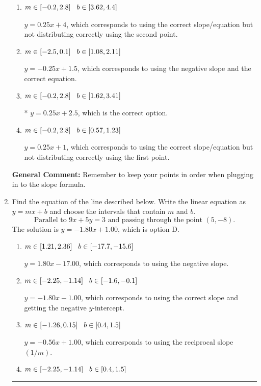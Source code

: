 \documentclass{extbook}[14pt]
\newcommand{\litem}[1]{\item #1

\rule{\textwidth}{0.4pt}}
\begin{document}
\begin{enumerate}
{\begin{enumerate}[label=\Alph*.]
 $y = 0.25x -2.5$, which corresponds to using the correct slope and getting the negative y-intercept.
\item \( m \in [-0.2, 2.8] \hspace*{3mm} b \in [3.62, 4.4] \)

 $y = 0.25x + 4$, which corresponds to using the correct slope/equation but not distributing correctly using the second point.
\item \( m \in [-2.5, 0.1] \hspace*{3mm} b \in [1.08, 2.11] \)

 $y = -0.25x + 1.5$, which corresponds to using the negative slope and the correct equation.
\item \( m \in [-0.2, 2.8] \hspace*{3mm} b \in [1.62, 3.41] \)

* $y = 0.25x + 2.5$, which is the correct option.
\item \( m \in [-0.2, 2.8] \hspace*{3mm} b \in [0.57, 1.23] \)

 $y = 0.25x + 1$, which corresponds to using the correct slope/equation but not distributing correctly using the first point.
\end{enumerate}

\textbf{General Comment:} Remember to keep your points in order when plugging in to the slope formula.
}
\litem{
Find the equation of the line described below. Write the linear equation as $ y=mx+b $ and choose the intervals that contain $m$ and $b$.
\[ \text{Parallel to } 9 x + 5 y = 3 \text{ and passing through the point } (5, -8). \]The solution is \( y = -1.80x + 1.00 \), which is option D.\begin{enumerate}[label=\Alph*.]
\item \( m \in [1.21, 2.36] \hspace*{3mm} b \in [-17.7, -15.6] \)

 $y = 1.80x - 17.00$, which corresponds to using the negative slope.
\item \( m \in [-2.25, -1.14] \hspace*{3mm} b \in [-1.6, -0.1] \)

 $y = -1.80x - 1.00$, which corresponds to using the correct slope and getting the negative $y$-intercept.
\item \( m \in [-1.26, 0.15] \hspace*{3mm} b \in [0.4, 1.5] \)

 $y = -0.56x + 1.00$, which corresponds to using the reciprocal slope $(1/m)$.
\item \( m \in [-2.25, -1.14] \hspace*{3mm} b \in [0.4, 1.5] \)


\end{enumerate}}
\end{enumerate}
\end{document}
